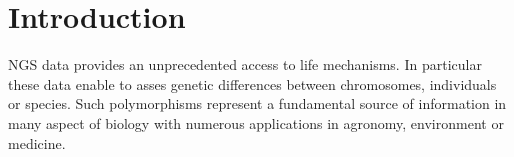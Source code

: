 \documentclass{bmcart}
\begin{document}
\begin{frontmatter}
\begin{abstractbox}

\begin{keyword}
\end{keyword}


\end{abstractbox}
%

\end{frontmatter}




\section*{Introduction}

NGS data provides an unprecedented access to life mechanisms. In particular these data enable to asses genetic differences between chromosomes, individuals or species. 
Such polymorphisms represent a fundamental source of information in many aspect of biology with numerous applications in agronomy, environment or medicine. 
\end{document}
